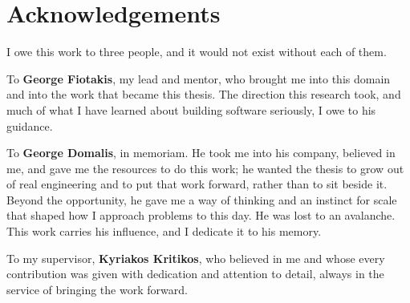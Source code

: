 \chapter*{Acknowledgements}

I owe this work to three people, and it would not exist without each of them.

To \textbf{George Fiotakis}, my lead and mentor, who brought me into this domain and into the work that became this thesis. The direction this research took, and much of what I have learned about building software seriously, I owe to his guidance.

To \textbf{George Domalis}, in memoriam. He took me into his company, believed in me, and gave me the resources to do this work; he wanted the thesis to grow out of real engineering and to put that work forward, rather than to sit beside it. Beyond the opportunity, he gave me a way of thinking and an instinct for scale that shaped how I approach problems to this day. He was lost to an avalanche. This work carries his influence, and I dedicate it to his memory.

To my supervisor, \textbf{Kyriakos Kritikos}, who believed in me and whose every contribution was given with dedication and attention to detail, always in the service of bringing the work forward.

\clearpage
